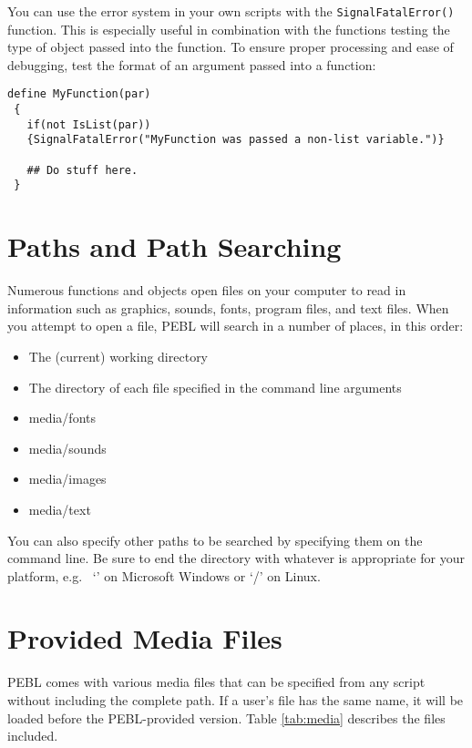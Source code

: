 You can use the error system in your own scripts with the
\texttt{SignalFatalError()} function.  This is especially useful in
combination with the functions testing the type of object passed into 
the function.  To ensure proper processing and ease of debugging, test
the format of an argument passed into a function:

\begin{verbatim}
define MyFunction(par)
 {
   if(not IsList(par))
   {SignalFatalError("MyFunction was passed a non-list variable.")}

   ## Do stuff here.
 }
\end{verbatim}
 


\section{Paths and Path Searching}

Numerous functions and objects open files on your computer to read in
information such as graphics, sounds, fonts, program files, and text files.  When you attempt to open a file, PEBL will search in a number of places, 
in this order:
\begin{itemize}
\item
The (current) working directory
\item
The directory of each file specified in the command line arguments
\item
media/fonts
\item
media/sounds
\item
media/images
\item
media/text
\end{itemize}
  
You can also specify other paths to be searched by specifying them on the command line.  Be sure to end the directory with whatever is appropriate for your platform, e.g.~ `' on Microsoft Windows or `/' on Linux.

\section{Provided Media Files}
\label{sec:media}

PEBL comes with various media files that can be specified from 
any script without including the complete path.  If a user's file has
the same name, it will be loaded before the PEBL-provided version.
Table \ref{tab:media} describes the files included.
\vspace{1cm}


